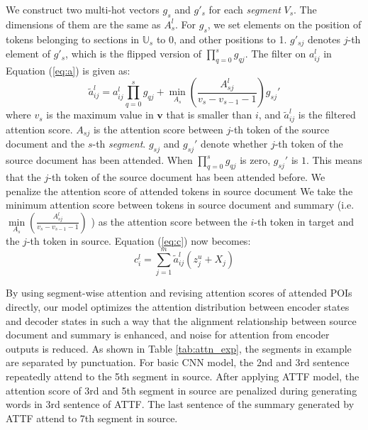 \documentclass{nle}
\theoremstyle{definition}
\newcommand{\tabref}[1]{Table \ref{#1}}
\begin{document}
We construct two multi-hot vectors $g_{s}$ and $g'_{s}$ for each \textit{segment} $V_{s}$.
The dimensions of them are the
same as $A_{s}^{l}$. For $g_{s}$, we set elements on the position of tokens
belonging to sections in $\mathbb{U}_{s}$ to 0, and other
positions to 1. 
$g'_{sj}$ denotes $j$-th element of $g'_{s}$, which is the flipped version of $\prod \limits_{q=0}^{s}g_{qj}$. 
The filter on $a_{ij}^{l}$ in Equation (\ref{eq:a}) is given as:
\begin{equation}
	\tilde{a}_{ij}^{l} = a_{ij}^{l}\prod_{q=0}^{s}g_{qj} + \min \limits_{A_{s}}\left(\frac{A_{sj}^{l}}{v_{s}-v_{s-1}-1}\right)g_{sj}'
\end{equation}
where $v_{s}$ is the maximum value in 
$\mathbf{v}$ that is smaller than $i$,  and $\tilde{a}_{ij}^l$ is the filtered
attention score. $A_{sj}$ is the attention score between $j$-th token
of the source document and the $s$-th \textit{segment}. 
$g_{sj}$ and $g_{sj}'$ denote whether $j$-th token
of the source document has been attended.
When $\prod \limits_{q=0}^{s}g_{qj}$ is zero, $g_{sj}'$ is $1$.
This means that the $j$-th token of the source document has been attended before.
We penalize the attention score of attended tokens in source document
We take the minimum attention score between tokens in source document and summary 
(i.e. $\min \limits_{A_{s}}\left(\frac{A_{sj}^{l}}{v_{s}-v_{s-1}-1}\right)$ )
as the attention score between the $i$-th token in target and the $j$-th token in source.
Equation (\ref{eq:c}) now becomes:
\begin{equation}
	c _ { i } ^ { l } = \sum _ { j = 1 } ^ { m } \tilde{a}_{ij}^{l} \left( z _ { j } ^ { u } + X_j \right)
\end{equation}

By using segment-wise attention and revising attention scores of attended POIs directly,
our model optimizes the
attention distribution between encoder states and decoder states in such a way that
the alignment relationship between source document and summary is enhanced, 
and noise for attention from encoder outputs is reduced. 
As shown in \tabref{tab:attn_exp}, the segments in example are separated by punctuation.
For basic CNN model, the 2nd and 3rd sentence repeatedly attend to 
the 5th segment in source.
After applying ATTF model, 
the attention score of 3rd and 5th segment in source are penalized 
during generating words in 3rd sentence of ATTF.
The last sentence of the summary generated by ATTF attend to 7th segment in source.
\end{document}

